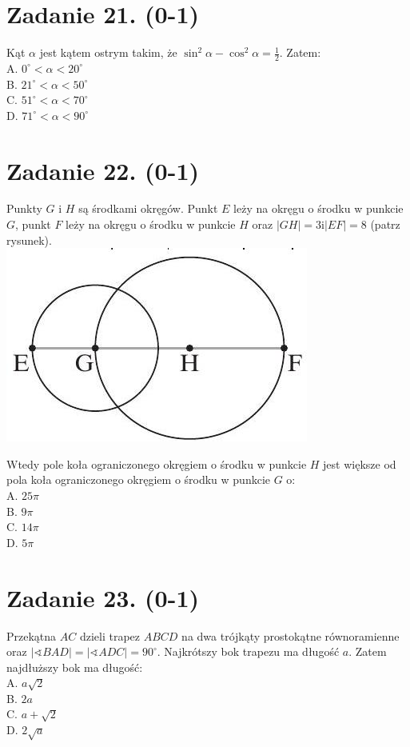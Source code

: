 \documentclass[10pt]{article}
\newcommand\varangle{\mathop{\sphericalangle}}
\begin{document}
\section*{Zadanie 21. (0-1)}
Kąt \(\alpha\) jest kątem ostrym takim, że \(\sin ^{2} \alpha-\cos ^{2} \alpha=\frac{1}{2}\). Zatem:\\
A. \(0^{\circ}<\alpha<20^{\circ}\)\\
B. \(21^{\circ}<\alpha<50^{\circ}\)\\
C. \(51^{\circ}<\alpha<70^{\circ}\)\\
D. \(71^{\circ}<\alpha<90^{\circ}\)

\section*{Zadanie 22. (0-1)}
Punkty \(G\) i \(H\) są środkami okręgów. Punkt \(E\) leży na okręgu o środku w punkcie \(G\), punkt \(F\) leży na okręgu o środku w punkcie \(H\) oraz \(|G H|=3 \mathrm{i}|E F|=8\) (patrz rysunek).\\
\includegraphics[max width=\textwidth, center]{2024_11_21_99eb8e6624b497a5af43g-08}

Wtedy pole koła ograniczonego okręgiem o środku w punkcie \(H\) jest większe od pola koła ograniczonego okręgiem o środku w punkcie \(G\) o:\\
A. \(25 \pi\)\\
B. \(9 \pi\)\\
C. \(14 \pi\)\\
D. \(5 \pi\)

\section*{Zadanie 23. (0-1)}
Przekątna \(A C\) dzieli trapez \(A B C D\) na dwa trójkąty prostokątne równoramienne oraz \(|\varangle B A D|=|\varangle A D C|=90^{\circ}\). Najkrótszy bok trapezu ma długość \(a\). Zatem najdłuższy bok ma długość:\\
A. \(a \sqrt{2}\)\\
B. \(2 a\)\\
C. \(a+\sqrt{2}\)\\
D. \(2 \sqrt{a}\)
\end{document}
